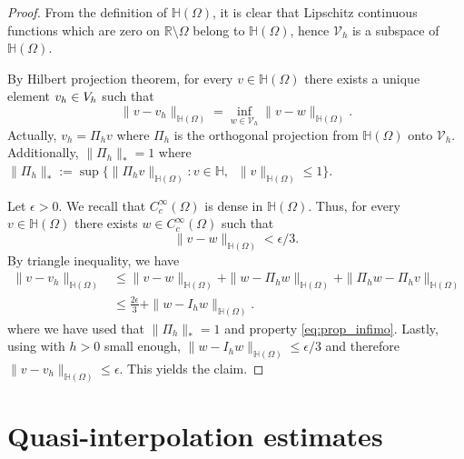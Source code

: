\documentclass[10 pt]{article}
\numberwithin{equation}{section}
\def\R{\mathbb{R}}
\begin{document}
\begin{proof}
%
From the definition of $\mathbb H(\Omega)$, it is clear that Lipschitz continuous functions which are zero on $\R\setminus \Omega$ belong to $\mathbb H(\Omega)$, hence $\mathcal V_h$ is a subspace of $\mathbb H(\Omega)$.

By Hilbert projection theorem, for every $v\in\mathbb H(\Omega)$ there exists a unique element $v_h\in\mathcal \mathcal V_h$ such that
%
\begin{equation}\label{eq:prop_infimo}
    \|v-v_h\|_{\mathbb H(\Omega)}=\inf_{w\in\mathcal V_h}\|v-w\|_{\mathbb H(\Omega)}. 
\end{equation}
%
Actually, $v_h=\Pi_h v$ where $\Pi_h$ is the orthogonal projection from $\mathbb H(\Omega)$ onto $\mathcal V_h$. Additionally, $\|\Pi_h\|_*=1$ where $\|\Pi_h\|_*:=\sup\{\|\Pi_hv\|_{\mathbb H(\Omega)}: v\in\mathbb{H},\;\; \|v\|_{\mathbb H(\Omega)}\leq 1\}$.

Let $\epsilon>0$. We recall that $C_c^\infty(\Omega)$ is dense in $\mathbb H(\Omega)$. Thus, for every $v\in\mathbb H(\Omega)$ there exists $w\in C_c^\infty(\Omega)$ such that 
%
\begin{equation}\label{eq:density}
    \|v-w\|_{\mathbb H(\Omega)}<\epsilon/3.
\end{equation}
%
By triangle inequality, we have
%
\begin{align}
    \|v-v_h\|_{\mathbb H(\Omega)}&\leq \|v-w\|_{\mathbb H(\Omega)}+\|w-\Pi_h w\|_{\mathbb H(\Omega)}+\|\Pi_h w-\Pi_h v\|_{\mathbb H(\Omega)} \\
    &\leq \frac{2\epsilon}{3}+\|w-I_hw\|_{\mathbb H(\Omega)}. 
\end{align}
%
where we have used that $\|\Pi_h\|_*=1$ and property \eqref{eq:prop_infimo}. Lastly, using  with $h>0$ small enough, $\|w-I_hw\|_{\mathbb H(\Omega)}\leq \epsilon/3$ and therefore $\|v-v_h\|_{\mathbb H(\Omega)}\leq \epsilon$. This yields the claim.
\end{proof}


\section{Quasi-interpolation estimates}\label{sec:estimates}
\end{document}
